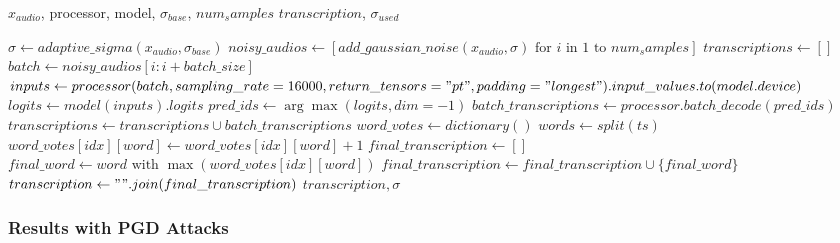 \documentclass[a4paper,12pt]{article}
\begin{document}
\begin{algorithm}
\caption{Randomized Smoothing Defense}
\begin{algorithmic}[1]
\Require $x_{audio}$, processor, model, $\sigma_{base}$, $num_samples$ 
\Ensure $transcription$, $\sigma_{used}$ 

\State $\sigma \gets adaptive\_sigma(x_{audio}, \sigma_{base})$ 
\State $noisy\_audios \gets [add\_gaussian\_noise(x_{audio}, \sigma) \text{ for } i \text{ in } 1 \text{ to } num_samples]$ 
\State $transcriptions \gets []$ 
 
    \State $batch \gets noisy\_audios[i:i+batch\_size]$
    \State $inputs \gets processor(batch, sampling\_rate=16000, return\_tensors="pt", padding="longest").input\_values.to(model.device)$ 
    \State $logits \gets model(inputs).logits$ 
    \State $pred\_ids \gets \arg\max(logits, dim=-1)$ 
    \State $batch\_transcriptions \gets processor.batch\_decode(pred\_ids)$ 
    \State $transcriptions \gets transcriptions \cup batch\_transcriptions$ 
\EndFor
\State $word\_votes \gets dictionary()$ 
 
    \State $words \gets split(ts)$
        \State $word\_votes[idx][word] \gets word\_votes[idx][word] + 1$
    \EndFor
\EndFor
\State $final\_transcription \gets []$ 
 
        \State $final\_word \gets word \text{ with } \max(word\_votes[idx][word])$
        \State $final\_transcription \gets final\_transcription \cup \{final\_word\}$
    \EndIf
\EndFor
\State $transcription \gets " ".join(final\_transcription)$ 
\State \Return $transcription, \sigma$ 
\end{algorithmic}
\end{algorithm}

\newpage
\subsubsection{Results with PGD Attacks}
\end{document}
